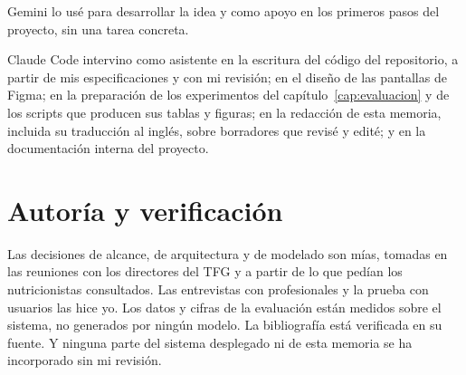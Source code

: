 Gemini lo usé para desarrollar la idea y como apoyo en los primeros pasos del proyecto, sin una tarea concreta.

Claude Code intervino como asistente en la escritura del código del repositorio, a partir de mis especificaciones y con mi revisión; en el diseño de las pantallas de Figma; en la preparación de los experimentos del capítulo~\ref{cap:evaluacion} y de los scripts que producen sus tablas y figuras; en la redacción de esta memoria, incluida su traducción al inglés, sobre borradores que revisé y edité; y en la documentación interna del proyecto.

\section{Autoría y verificación}
\label{sec:declaracionAutoria}

Las decisiones de alcance, de arquitectura y de modelado son mías, tomadas en las reuniones con los directores del TFG y a partir de lo que pedían los nutricionistas consultados. Las entrevistas con profesionales y la prueba con usuarios las hice yo. Los datos y cifras de la evaluación están medidos sobre el sistema, no generados por ningún modelo. La bibliografía está verificada en su fuente. Y ninguna parte del sistema desplegado ni de esta memoria se ha incorporado sin mi revisión.
